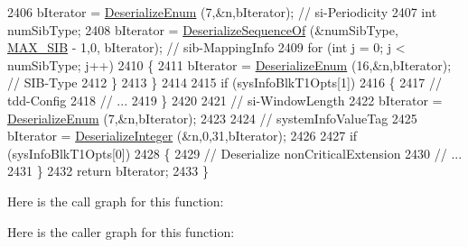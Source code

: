 \begin{DoxyCode}
2406       bIterator = \hyperlink{classns3_1_1Asn1Header_a4fcc253e0eec3483c775b005c1875f2d}{DeserializeEnum} (7,&n,bIterator); \textcolor{comment}{// si-Periodicity}
2407       \textcolor{keywordtype}{int} numSibType;
2408       bIterator = \hyperlink{classns3_1_1Asn1Header_a1a7245e05b482df8abade0a060bd0ecc}{DeserializeSequenceOf} (&numSibType,
      \hyperlink{lte-rrc-header_8cc_a6cc8a5c99fe3f31ebb69f4eb23916dcd}{MAX\_SIB} - 1,0, bIterator); \textcolor{comment}{// sib-MappingInfo}
2409       \textcolor{keywordflow}{for} (\textcolor{keywordtype}{int} j = 0; j < numSibType; j++)
2410         \{
2411           bIterator = \hyperlink{classns3_1_1Asn1Header_a4fcc253e0eec3483c775b005c1875f2d}{DeserializeEnum} (16,&n,bIterator); \textcolor{comment}{// SIB-Type}
2412         \}
2413     \}
2414 
2415   \textcolor{keywordflow}{if} (sysInfoBlkT1Opts[1])
2416     \{
2417       \textcolor{comment}{// tdd-Config}
2418       \textcolor{comment}{// ...}
2419     \}
2420 
2421   \textcolor{comment}{// si-WindowLength}
2422   bIterator = \hyperlink{classns3_1_1Asn1Header_a4fcc253e0eec3483c775b005c1875f2d}{DeserializeEnum} (7,&n,bIterator);
2423 
2424   \textcolor{comment}{// systemInfoValueTag}
2425   bIterator = \hyperlink{classns3_1_1Asn1Header_a49802c9af30018b078150e866b6ecae2}{DeserializeInteger} (&n,0,31,bIterator);
2426 
2427   \textcolor{keywordflow}{if} (sysInfoBlkT1Opts[0])
2428     \{
2429       \textcolor{comment}{// Deserialize nonCriticalExtension}
2430       \textcolor{comment}{// ...}
2431     \}
2432   \textcolor{keywordflow}{return} bIterator;
2433 \}
\end{DoxyCode}


Here is the call graph for this function\+:




Here is the caller graph for this function\+:


